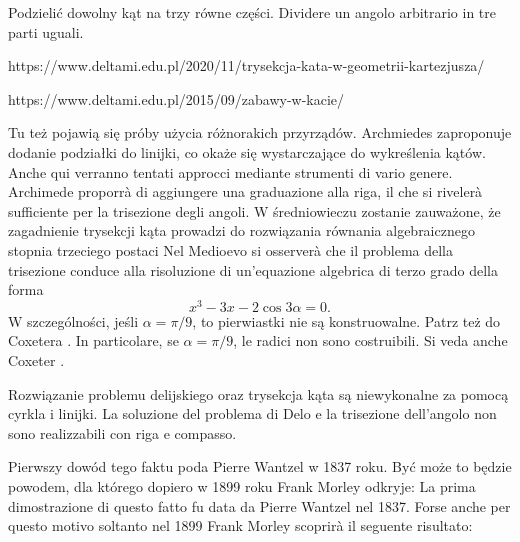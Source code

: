 \begin{problem}
[trysekcja kąta] %
[trisezione dell'angolo] %
    \label{trysekcja_kata}%
    Podzielić dowolny kąt na trzy równe części. %
    Dividere un angolo arbitrario in tre parti uguali. %
\end{problem}

https://www.deltami.edu.pl/2020/11/trysekcja-kata-w-geometrii-kartezjusza/

https://www.deltami.edu.pl/2015/09/zabawy-w-kacie/

Tu też pojawią się próby użycia różnorakich przyrządów. %
Archmiedes zaproponuje dodanie podziałki do linijki, co okaże się wystarczające do wykreślenia kątów. %
Anche qui verranno tentati approcci mediante strumenti di vario genere. %
Archimede proporrà di aggiungere una graduazione alla riga, il che si rivelerà sufficiente per la trisezione degli angoli. %
W średniowieczu zostanie zauważone, że zagadnienie trysekcji kąta prowadzi do rozwiązania równania algebraicznego stopnia trzeciego postaci %
Nel Medioevo si osserverà che il problema della trisezione conduce alla risoluzione di un'equazione algebrica di terzo grado della forma %
\begin{equation}
    x^3 - 3 x - 2 \cos 3\alpha = 0.
\end{equation}
W szczególności, jeśli $\alpha = \pi / 9$, to pierwiastki nie są konstruowalne. %
Patrz też do Coxetera \cite[s. 44]{coxeter_1967}. %
In particolare, se $\alpha = \pi / 9$, le radici non sono costruibili. %
Si veda anche Coxeter \cite[p. 44]{coxeter_1967}. %

\begin{proposition}
    Rozwiązanie problemu delijskiego oraz trysekcja kąta są niewykonalne za pomocą cyrkla i linijki. %
    La soluzione del problema di Delo e la trisezione dell'angolo non sono realizzabili con riga e compasso. %
\end{proposition}

Pierwszy dowód tego faktu poda Pierre Wantzel \cite{wantzel_1837} w 1837 roku. %
Być może to będzie powodem, dla którego dopiero w 1899 roku Frank Morley \cite{morley_1907} odkryje: %
La prima dimostrazione di questo fatto fu data da Pierre Wantzel \cite{wantzel_1837} nel 1837. %
Forse anche per questo motivo soltanto nel 1899 Frank Morley \cite{morley_1907} scoprirà il seguente risultato: %

